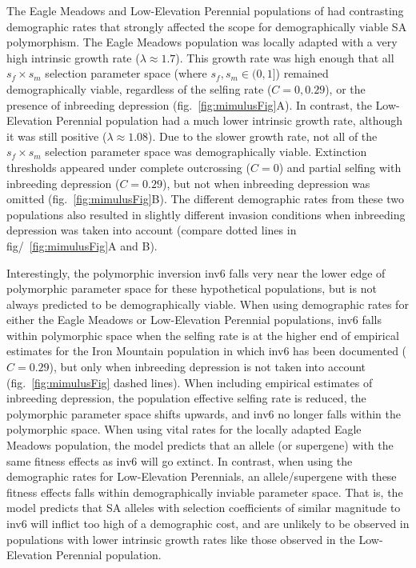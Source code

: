 \documentclass[11pt]{article}
\begin{document}
The Eagle Meadows and Low-Elevation Perennial populations of \citet{PetersonEtAl2016} had contrasting demographic rates that strongly affected the scope for demographically viable SA polymorphism. The Eagle Meadows population was locally adapted with a very high intrinsic growth rate ($\lambda \approx 1.7$). This growth rate was high enough that all $s_f \times s_m$ selection parameter space (where $s_f, s_m \in (0,1]$) remained demographically viable, regardless of the selfing rate ($C = 0,0.29$), or the presence of inbreeding depression (fig.~\ref{fig:mimulusFig}A). In contrast, the Low-Elevation Perennial population had a much lower intrinsic growth rate, although it was still positive ($\lambda \approx 1.08$). Due to the slower growth rate, not all of the $s_f \times s_m$ selection parameter space was demographically viable. Extinction thresholds appeared under complete outcrossing ($C = 0$) and partial selfing with inbreeding depression ($C = 0.29$), but not when inbreeding depression was omitted (fig.~\ref{fig:mimulusFig}B). The different demographic rates from these two populations also resulted in slightly different invasion conditions when inbreeding depression was taken into account (compare dotted lines in fig/~\ref{fig:mimulusFig}A and B).

Interestingly, the polymorphic inversion inv6 falls very near the lower edge of polymorphic parameter space for these hypothetical populations, but is not always predicted to be demographically viable. When using demographic rates for either the Eagle Meadows or Low-Elevation Perennial populations, inv6 falls within polymorphic space when the selfing rate is at the higher end of empirical estimates for the Iron Mountain population in which inv6 has been documented ($C = 0.29$), but only when inbreeding depression is not taken into account (fig.~\ref{fig:mimulusFig} dashed lines). When including empirical estimates of inbreeding depression, the population effective selfing rate is reduced, the polymorphic parameter space shifts upwards, and inv6 no longer falls within the polymorphic space. When using vital rates for the locally adapted Eagle Meadows population, the model predicts that an allele (or supergene) with the same fitness effects as inv6 will go extinct. In contrast, when using the demographic rates for Low-Elevation Perennials, an allele/supergene with these fitness effects falls within demographically inviable parameter space. That is, the model predicts that SA alleles with selection coefficients of similar magnitude to inv6 will inflict too high of a demographic cost, and are unlikely to be observed in populations with lower intrinsic growth rates like those observed in the Low-Elevation Perennial population.
\end{document}
